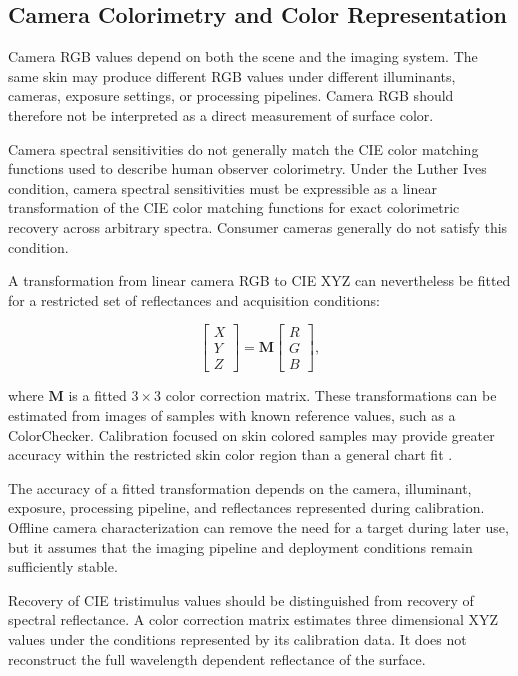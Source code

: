 \documentclass[12pt]{article}
\begin{document}
\subsection{Camera Colorimetry and Color Representation}

Camera RGB values depend on both the scene and the imaging system. The same skin may produce different RGB values under different illuminants, cameras, exposure settings, or processing pipelines. Camera RGB should therefore not be interpreted as a direct measurement of surface color.

Camera spectral sensitivities do not generally match the CIE color matching functions used to describe human observer colorimetry. Under the Luther Ives condition, camera spectral sensitivities must be expressible as a linear transformation of the CIE color matching functions for exact colorimetric recovery across arbitrary spectra. Consumer cameras generally do not satisfy this condition.

A transformation from linear camera RGB to CIE XYZ can nevertheless be fitted for a restricted set of reflectances and acquisition conditions:

\begin{equation}
\begin{bmatrix}X\\Y\\Z\end{bmatrix}
=
\mathbf{M}
\begin{bmatrix}R\\G\\B\end{bmatrix},
\end{equation}

where \(\mathbf{M}\) is a fitted \(3 \times 3\) color correction matrix. These transformations can be estimated from images of samples with known reference values, such as a ColorChecker. Calibration focused on skin colored samples may provide greater accuracy within the restricted skin color region than a general chart fit \cite{harville2005,choi2017}.

The accuracy of a fitted transformation depends on the camera, illuminant, exposure, processing pipeline, and reflectances represented during calibration. Offline camera characterization can remove the need for a target during later use, but it assumes that the imaging pipeline and deployment conditions remain sufficiently stable.

Recovery of CIE tristimulus values should be distinguished from recovery of spectral reflectance. A color correction matrix estimates three dimensional XYZ values under the conditions represented by its calibration data. It does not reconstruct the full wavelength dependent reflectance of the surface.
\end{document}
